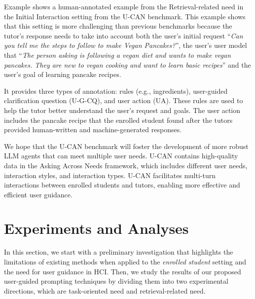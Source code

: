 \documentclass{article} %
\theoremstyle{definition}
\begin{document}
Example shows a human-annotated example from the Retrieval-related need in the Initial Interaction setting from the U-CAN benchmark.
This example shows that this setting is more challenging than previous benchmarks because the tutor's response needs to take into account both the user's initial request ``\textit{Can you tell me the steps to follow to make Vegan Pancakes?}'', the user's user model that ``\textit{The person asking is following a vegan diet and wants to make vegan pancakes. They are new to vegan cooking and want to learn basic recipes}'' and the user's goal of learning pancake recipes.

It provides three types of annotation: \colorbox{rulescolor}{rules} (e.g., ingredients), \colorbox{methodcolor}{user-guided clarification question} (U-G-CQ), and \colorbox{answercolor}{user action} (UA).
These rules are used to help the tutor better understand the user's request and goals.
The user action includes the pancake recipe that the enrolled student found after the tutors provided human-written and machine-generated responses.



We hope that the U-CAN benchmark will foster the development of more robust LLM agents that can meet multiple user needs. U-CAN contains high-quality data in the Asking Across Needs framework, which includes different user needs, interaction styles, and interaction types. U-CAN facilitates multi-turn interactions between enrolled students and tutors, enabling more effective and efficient user guidance.




\section{Experiments and Analyses}

\label{sec:experiment}
In this section, we start with a preliminary investigation that highlights the limitations of existing methods when applied to the \textit{enrolled student} setting and the need for user guidance in HCI. Then, we study the results of our proposed user-guided prompting techniques by dividing them into two experimental directions, which are task-oriented need and retrieval-related need.
\end{document}
